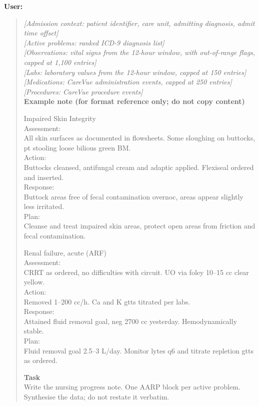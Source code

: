 \documentclass[sigconf,anonymous=false,review=false]{acmart}
\begin{document}
\textbf{User:}
\begin{quote}
\small
\textit{[Admission context: patient identifier, care unit, admitting
diagnosis, admit time offset]}\\
\textit{[Active problems: ranked ICD-9 diagnosis list]}\\
\textit{[Observations: vital signs from the 12-hour window, with
out-of-range flags, capped at 1,100 entries]}\\
\textit{[Labs: laboratory values from the 12-hour window, capped at 150 entries]}\\
\textit{[Medications: CareVue administration events, capped at 250 entries]}\\
\textit{[Procedures: CareVue procedure events]}\\

\medskip
\textbf{Example note (for format reference only; do not copy content)}

\smallskip
Impaired Skin Integrity\\
Assessment:\\
All skin surfaces as documented in flowsheets. Some sloughing on buttocks,
pt stooling loose bilious green BM.\\
Action:\\
Buttocks cleansed, antifungal cream and adaptic applied. Flexiseal ordered
and inserted.\\
Response:\\
Buttock areas free of fecal contamination overnoc, areas appear slightly
less irritated.\\
Plan:\\
Cleanse and treat impaired skin areas, protect open areas from friction and
fecal contamination.

\medskip
Renal failure, acute (ARF)\\
Assessment:\\
CRRT as ordered, no difficulties with circuit. UO via foley 10--15 cc clear
yellow.\\
Action:\\
Removed 1--200 cc/h. Ca and K gtts titrated per labs.\\
Response:\\
Attained fluid removal goal, neg 2700 cc yesterday. Hemodynamically stable.\\
Plan:\\
Fluid removal goal 2.5--3 L/day. Monitor lytes q6 and titrate repletion
gtts as ordered.

\medskip
\textbf{Task}\\
Write the nursing progress note. One AARP block per active problem.
Synthesise the data; do not restate it verbatim.
\end{quote}
\end{document}

